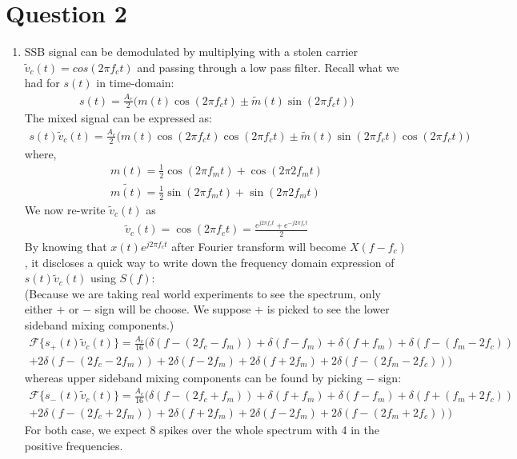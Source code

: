 \documentclass[11pt]{article}
\begin{document}
\section*{Question 2}
\begin{enumerate}[label=(\alph*)]
\item SSB signal can be demodulated by multiplying with a stolen carrier $\tilde{v}_c(t)=cos(2\pi f_c t)$ and passing through a low pass filter. Recall what we had for $s(t)$ in time-domain:
\begin{align*}
    s(t)=\frac{A_c}{2} \biggr (m(t)\cos(2\pi f_c t) \pm \tilde{m}(t)\sin(2\pi f_c t) \biggr)
\end{align*}
The mixed signal can be expressed as:
\begin{align*}
    s(t)\tilde{v}_c(t)=\frac{A_c}{2} \biggr (m(t)\cos(2\pi f_c t)\cos(2\pi f_c t) \pm \tilde{m}(t) \sin(2\pi f_c t) \cos(2\pi f_c t) \biggr)
\end{align*}
where,
\begin{align*}
    m(t)=\frac{1}{2} \cos(2\pi f_m t)+ \cos(2\pi 2f_m t) \\
    \tilde{m(t)}=\frac{1}{2}\sin(2\pi f_m t)+ \sin(2\pi 2f_m t)
\end{align*}
We now re-write $\tilde{v}_c(t)$ as
\begin{align*}
    \tilde{v}_c(t)= \cos(2\pi f_c t)=\frac{e^{j2\pi f_c t }+e^{-j2\pi f_c t }}{2}
\end{align*}
By knowing that $x(t)e^{j2\pi f_c t }$ after Fourier transform will become $X(f-f_c)$, it discloses a quick way to write down the frequency domain expression of $s(t)\tilde{v}_c(t)$ using $S(f)$: \\
(Because we are taking real world experiments to see the spectrum, only either $+$ or $-$ sign will be choose. We suppose $+$ is picked to see the lower sideband mixing components.)
\begin{align*}
    \mathcal{F}\{s_{+}(t)\tilde{v}_c(t)\}= \frac{A_c}{16}\bigg ( \delta(f-(2f_c-f_m))+\delta(f-f_m)+\delta(f+f_m)+\delta(f-(f_m-2f_c)) \\
    +2\delta(f-(2f_c-2f_m))+2\delta(f-2f_m)+2\delta(f+2f_m)+2\delta(f-(2f_m-2f_c)) \bigg )
\end{align*}
whereas upper sideband mixing components can be found by picking $-$ sign:
\begin{align*}
    \mathcal{F}\{s_{-}(t)\tilde{v}_c(t)\}= \frac{A_c}{16}\bigg ( \delta(f-(2f_c+f_m))+\delta(f+f_m)+\delta(f-f_m)+\delta(f+(f_m+2f_c)) \\
    +2\delta(f-(2f_c+2f_m))+2\delta(f+2f_m)+2\delta(f-2f_m)+2\delta(f-(2f_m+2f_c)) \bigg )
\end{align*}
For both case, we expect 8 spikes over the whole spectrum with 4 in the positive frequencies.


\end{enumerate}
\end{document}
